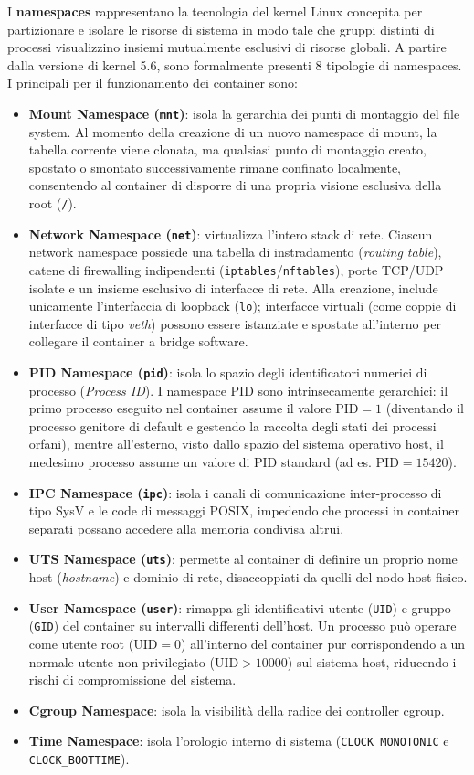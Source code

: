 \documentclass[11pt, a4paper]{article}
\begin{document}
I \textbf{namespaces} rappresentano la tecnologia del kernel Linux concepita per partizionare e isolare le risorse di sistema in modo tale che gruppi distinti di processi visualizzino insiemi mutualmente esclusivi di risorse globali. A partire dalla versione di kernel 5.6, sono formalmente presenti 8 tipologie di namespaces. I principali per il funzionamento dei container sono:
\begin{itemize}
    \item \textbf{Mount Namespace (\texttt{mnt})}: isola la gerarchia dei punti di montaggio del file system. Al momento della creazione di un nuovo namespace di mount, la tabella corrente viene clonata, ma qualsiasi punto di montaggio creato, spostato o smontato successivamente rimane confinato localmente, consentendo al container di disporre di una propria visione esclusiva della root (\texttt{/}).
    \item \textbf{Network Namespace (\texttt{net})}: virtualizza l'intero stack di rete. Ciascun network namespace possiede una tabella di instradamento (\emph{routing table}), catene di firewalling indipendenti (\texttt{iptables}/\texttt{nftables}), porte TCP/UDP isolate e un insieme esclusivo di interfacce di rete. Alla creazione, include unicamente l'interfaccia di loopback (\texttt{lo}); interfacce virtuali (come coppie di interfacce di tipo \emph{veth}) possono essere istanziate e spostate all'interno per collegare il container a bridge software.
    \item \textbf{PID Namespace (\texttt{pid})}: isola lo spazio degli identificatori numerici di processo (\emph{Process ID}). I namespace PID sono intrinsecamente gerarchici: il primo processo eseguito nel container assume il valore $\text{PID} = 1$ (diventando il processo genitore di default e gestendo la raccolta degli stati dei processi orfani), mentre all'esterno, visto dallo spazio del sistema operativo host, il medesimo processo assume un valore di PID standard (ad es. $\text{PID} = 15420$).
    \item \textbf{IPC Namespace (\texttt{ipc})}: isola i canali di comunicazione inter-processo di tipo SysV e le code di messaggi POSIX, impedendo che processi in container separati possano accedere alla memoria condivisa altrui.
    \item \textbf{UTS Namespace (\texttt{uts})}: permette al container di definire un proprio nome host (\emph{hostname}) e dominio di rete, disaccoppiati da quelli del nodo host fisico.
    \item \textbf{User Namespace (\texttt{user})}: rimappa gli identificativi utente (\texttt{UID}) e gruppo (\texttt{GID}) del container su intervalli differenti dell'host. Un processo può operare come utente root ($\text{UID} = 0$) all'interno del container pur corrispondendo a un normale utente non privilegiato ($\text{UID} > 10000$) sul sistema host, riducendo i rischi di compromissione del sistema.
    \item \textbf{Cgroup Namespace}: isola la visibilità della radice dei controller cgroup.
    \item \textbf{Time Namespace}: isola l'orologio interno di sistema (\texttt{CLOCK\_MONOTONIC} e \texttt{CLOCK\_BOOTTIME}).
\end{itemize}
\end{document}
